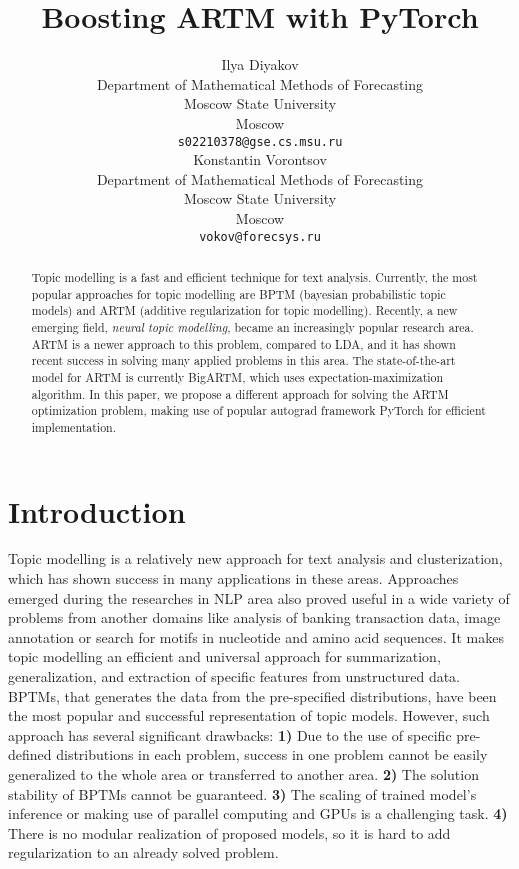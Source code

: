 \documentclass{article}
\title{Boosting ARTM with PyTorch}
\author{ \hspace{1mm} Ilya Diyakov \\
	Department of Mathematical Methods of Forecasting\\
	Moscow State University\\
	Moscow \\
	\texttt{s02210378@gse.cs.msu.ru} \\
	\And
	\hspace{1mm} Konstantin Vorontsov \\
	Department of Mathematical Methods of Forecasting\\
	Moscow State University\\
	Moscow \\
	\texttt{vokov@forecsys.ru} \\
}
\begin{document}
\maketitle

\begin{abstract}
	Topic modelling is a fast and efficient technique for text analysis. Currently, the most popular approaches for topic modelling are BPTM (bayesian probabilistic topic models) and ARTM (additive regularization for topic modelling). Recently, a new emerging field, \emph{neural topic modelling}, became an increasingly popular research area. ARTM is a newer approach to this problem, compared to LDA, and it has shown recent success in solving many applied problems in this area. The state-of-the-art model for ARTM is currently BigARTM, which uses expectation-maximization algorithm. In this paper, we propose a different approach for solving the ARTM optimization problem, making use of popular autograd framework PyTorch for efficient implementation.
\end{abstract}




\section{\centering Introduction}
\label{sec:introduction}
Topic modelling is a relatively new approach for text analysis and clusterization, which has shown success in many applications in these areas. Approaches emerged during the researches in NLP area also proved useful in a wide variety of problems from another domains like analysis of banking transaction data, image annotation or search for motifs in nucleotide and amino acid sequences. It makes topic modelling an efficient and universal approach for summarization, generalization, and extraction of specific features from unstructured data. \\

BPTMs, that generates the data from the pre-specified distributions, have been the most popular and successful representation of topic models. However, such approach has several significant drawbacks: \textbf{1)} Due to the use of specific pre-defined distributions in each problem, success in one problem cannot be easily generalized to the whole area or transferred to another area. \textbf{2)} The solution stability of BPTMs cannot be guaranteed. \textbf{3)} The scaling of trained model's inference or making use of parallel computing and GPUs is a challenging task. \textbf{4)} There is no modular realization of proposed models, so it is hard to add regularization to an already solved problem. \\
\end{document}
